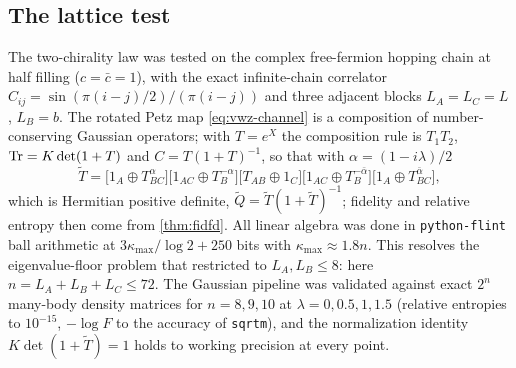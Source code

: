 \subsection{The lattice test}
The two-chirality law was tested on the complex free-fermion hopping chain at half
filling ($c=\bar c=1$), with the exact infinite-chain correlator
$C_{ij}=\sin(\pi(i-j)/2)/(\pi(i-j))$ and three adjacent blocks $L_A=L_C=L$,
$L_B=b$.  The rotated Petz map \eqref{eq:vwz-channel} is a composition of
number-conserving Gaussian operators; with $T=e^X$ the composition rule is
$T_1T_2$, $\operatorname{Tr}=K\det(1+T)$ and $C=T(1+T)^{-1}$, so that with $\alpha=(1-i\lambda)/2$
\begin{equation}\label{eq:lattice-T}
 \widetilde T=\bigl[1_A\oplus T_{BC}^{\alpha}\bigr]
 \bigl[1_{AC}\oplus T_B^{-\alpha}\bigr]
 \bigl[T_{AB}\oplus 1_C\bigr]
 \bigl[1_{AC}\oplus T_B^{-\bar\alpha}\bigr]
 \bigl[1_A\oplus T_{BC}^{\bar\alpha}\bigr],
\end{equation}
which is Hermitian positive definite, $\widetilde Q=\widetilde T(1+\widetilde
T)^{-1}$; fidelity and relative entropy then come from \cref{thm:fidfd}.  All
linear algebra was done in \texttt{python-flint} ball arithmetic at
$3\kappa_{\max}/\log2+250$ bits with $\kappa_{\max}\approx1.8n$.  This resolves
the eigenvalue-floor problem that restricted \cite{VWZ} to $L_A,L_B\le8$: here
$n=L_A+L_B+L_C\le72$.  The Gaussian pipeline was validated against exact $2^n$
many-body density matrices for $n=8,9,10$ at $\lambda=0,0.5,1,1.5$ (relative
entropies to $10^{-15}$, $-\log F$ to the accuracy of \texttt{sqrtm}), and the
normalization identity $K\det(1+\widetilde T)=1$ holds to working precision at
every point.

